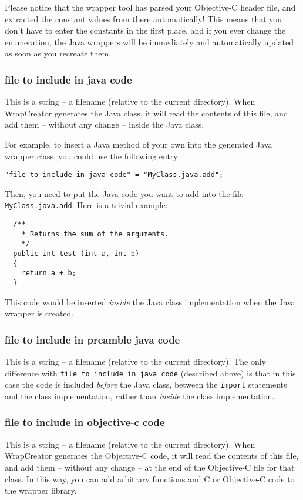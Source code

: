 Please notice that the wrapper tool has parsed your Objective-C header
file, and extracted the constant values from there automatically!
This means that you don't have to enter the constants in the first
place, and if you ever change the enumeration, the Java wrappers will
be immediately and automatically updated as soon as you recreate them.

\subsubsection{file to include in java code}
This is a string -- a filename (relative to the current directory).
When WrapCreator generates the Java class, it will read the contents
of this file, and add them -- without any change -- inside the Java
class.

For example, to insert a Java method of your own into the generated 
Java wrapper class, you could use the following entry:
\begin{verbatim}
"file to include in java code" = "MyClass.java.add";
\end{verbatim}
Then, you need to put the Java code you want to add into the file
\texttt{MyClass.java.add}.  Here is a trivial example:
\begin{verbatim}
  /**
    * Returns the sum of the arguments.
    */
  public int test (int a, int b)
  {
    return a + b;
  }
\end{verbatim}
This code would be inserted {\em inside} the Java class implementation 
when the Java wrapper is created.

\subsubsection{file to include in preamble java code}
This is a string -- a filename (relative to the current directory).
The only difference with \texttt{file to include in java code}
(described above) is that in this case the code is included {\em
before} the Java class, between the \texttt{import} statements and the
class implementation, rather than {\em inside} the class
implementation.

\subsubsection{file to include in objective-c code}
This is a string -- a filename (relative to the current directory).
When WrapCreator generates the Objective-C code, it will read the
contents of this file, and add them -- without any change -- at the
end of the Objective-C file for that class.  In this way, you can add
arbitrary functions and C or Objective-C code to the wrapper library.

